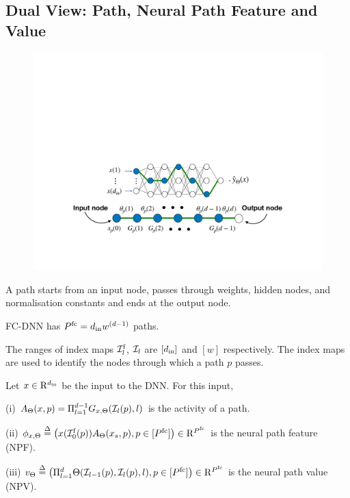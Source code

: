 \subsection{Dual View: Path, Neural Path Feature and Value}
\FloatBarrier
\begin{figure}[h]
\centering
\includegraphics[scale=0.32]{figs/paths.pdf}
\end{figure}

\begin{definition}
A path starts from an input node, passes through weights, hidden nodes, and normalisation constants and ends at the output node.
\end{definition}
\begin{proposition}
FC-DNN has $P^{\text{fc}}=d_{\text{in}} w^{(d-1)}$ paths.
\end{proposition}
\begin{notation}
The ranges of index maps $\mathcal{I}^{\text{f}}_l$, $\mathcal{I}_l$ are $[d_{\text{in}}]$ and $[w]$ respectively. The index maps are used to identify the nodes through which a path $p$ passes.
\end{notation}

\begin{definition}\label{def:nps} Let $x\in\mathrm{R}^{d_{\text{in}}}$ be the input to the DNN. For this input, 

(i)  $A_{\Theta}(x,p)=\Pi_{l=1}^{d-1} G_{x,\Theta}(\mathcal{I}_l(p),l)$ is the activity of a path.

(ii)  $\phi_{x,\Theta}\stackrel{\Delta}{=} \left( x(\mathcal{I}^{\text{f}}_0(p))A_{\Theta}(x_s,p), p\in[P^{\text{fc}}]\right)\in\mathrm{R}^{P^{\text{fc}}}$ is the {neural path feature} (NPF).

(iii)  $v_{\Theta}\stackrel{\Delta}{=} \left( \Pi_{l=1}^d \Theta(\mathcal{I}_{l-1}(p),\mathcal{I}_l(p),l), p\in[P^{\text{fc}}]\right)\in\mathrm{R}^{P^{\text{fc}}}$ is the {neural path value} (NPV).
\end{definition}

